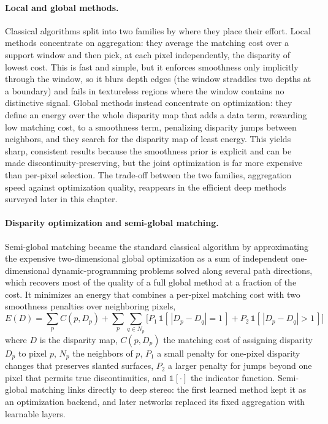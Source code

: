\paragraph{Local and global methods.}
Classical algorithms split into two families by where they place their
effort. Local methods concentrate on aggregation: they average the
matching cost over a support window and then pick, at each pixel
independently, the disparity of lowest cost. This is fast and simple, but
it enforces smoothness only implicitly through the window, so it blurs
depth edges (the window straddles two depths at a boundary) and fails in
textureless regions where the window contains no distinctive signal.
Global methods instead concentrate on optimization: they define an energy
over the whole disparity map that adds a data term, rewarding low matching
cost, to a smoothness term, penalizing disparity jumps between neighbors,
and they search for the disparity map of least energy. This yields sharp,
consistent results because the smoothness prior is explicit and can be made
discontinuity-preserving, but the joint optimization is far more expensive
than per-pixel selection. The trade-off between the two families,
aggregation speed against optimization quality, reappears in the
efficient deep methods surveyed later in this chapter.

\paragraph{Disparity optimization and semi-global matching.}
Semi-global matching \cite{hirschmuller2008sgm} became the standard
classical algorithm by approximating the expensive two-dimensional global
optimization as a sum of independent one-dimensional dynamic-programming
problems solved along several path directions, which recovers most of the
quality of a full global method at a fraction of the cost. It minimizes an energy that
combines a per-pixel matching cost with two smoothness penalties over
neighboring pixels,
\begin{equation}
E(D) = \sum_{p} C(p, D_p)
  + \sum_{p} \sum_{q \in N_p} \Big[
      P_1\, \mathbb{1}\!\left[\,|D_p - D_q| = 1\,\right]
    + P_2\, \mathbb{1}\!\left[\,|D_p - D_q| > 1\,\right] \Big]
\label{eq:sgm_energy}
\end{equation}
where $D$ is the disparity map, $C(p, D_p)$ the matching cost of assigning
disparity $D_p$ to pixel $p$, $N_p$ the neighbors of $p$, $P_1$ a small
penalty for one-pixel disparity changes that preserves slanted surfaces,
$P_2$ a larger penalty for jumps beyond one pixel that permits true
discontinuities, and $\mathbb{1}[\cdot]$ the indicator function. Semi-global
matching links directly to deep stereo: the first learned method kept it
as an optimization backend, and later networks replaced its fixed
aggregation with learnable layers.

